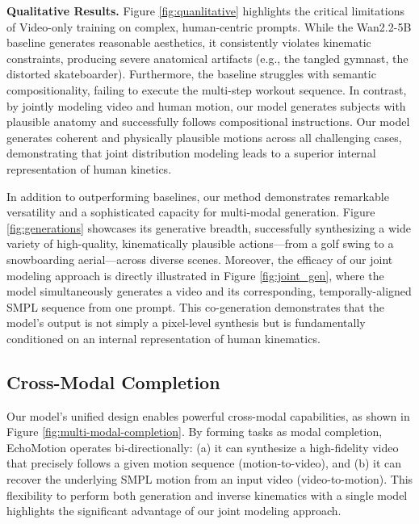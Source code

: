  \textbf{Qualitative Results.}
Figure \ref{fig:quanlitative} highlights the critical limitations of Video-only training on complex, human-centric prompts. While the Wan2.2-5B baseline generates reasonable aesthetics, it consistently violates kinematic constraints, producing severe anatomical artifacts (e.g., the tangled gymnast, the distorted skateboarder). Furthermore, the baseline struggles with semantic compositionality, failing to execute the multi-step workout sequence. In contrast, by jointly modeling video and human motion, our model generates subjects with plausible anatomy and successfully follows compositional instructions. Our model generates coherent and physically plausible motions across all challenging cases, demonstrating that joint distribution modeling leads to a superior internal representation of human kinetics.
 
In addition to outperforming baselines, our method demonstrates remarkable versatility and a sophisticated capacity for multi-modal generation.
Figure \ref{fig:generations} showcases its generative breadth, successfully synthesizing a wide variety of high-quality, kinematically plausible actions—from a golf swing to a snowboarding aerial—across diverse scenes. Moreover, the efficacy of our joint modeling approach is directly illustrated in Figure \ref{fig:joint_gen}, where the model simultaneously generates a video and its corresponding, temporally-aligned SMPL sequence from one prompt. This co-generation demonstrates that the model's output is not simply a pixel-level synthesis but is fundamentally conditioned on an internal representation of human kinematics.

\subsection{Cross-Modal Completion}


Our model's unified design enables powerful cross-modal capabilities, as shown in Figure \ref{fig:multi-modal-completion}. By forming tasks as modal completion, EchoMotion operates bi-directionally: (a) it can synthesize a high-fidelity video that precisely follows a given motion sequence (motion-to-video), and (b) it can recover the underlying SMPL motion from an input video (video-to-motion). This flexibility to perform both generation and inverse kinematics with a single model highlights the significant advantage of our joint modeling approach. 



